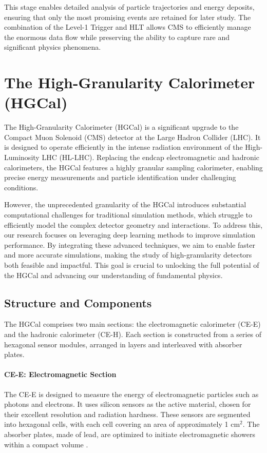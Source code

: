 This stage enables detailed analysis of particle trajectories and energy deposits, ensuring that only the most promising events are retained for later study. The combination of the Level-1 Trigger and HLT allows CMS to efficiently manage the enormous data flow while preserving the ability to capture rare and significant physics phenomena.

\section{The High-Granularity Calorimeter (HGCal)}

The High-Granularity Calorimeter (HGCal) is a significant upgrade to the Compact Muon Solenoid (CMS) detector at the Large Hadron Collider (LHC). It is designed to operate efficiently in the intense radiation environment of the High-Luminosity LHC (HL-LHC). Replacing the endcap electromagnetic and hadronic calorimeters, the HGCal features a highly granular sampling calorimeter, enabling precise energy measurements and particle identification under challenging conditions.

However, the unprecedented granularity of the HGCal introduces substantial computational challenges for traditional simulation methods, which struggle to efficiently model the complex detector geometry and interactions. To address this, our research focuses on leveraging deep learning methods to improve simulation performance. By integrating these advanced techniques, we aim to enable faster and more accurate simulations, making the study of high-granularity detectors both feasible and impactful. This goal is crucial to unlocking the full potential of the HGCal and advancing our understanding of fundamental physics.

\subsection{Structure and Components}

The HGCal comprises two main sections: the electromagnetic calorimeter (CE-E) and the hadronic calorimeter (CE-H). Each section is constructed from a series of hexagonal sensor modules, arranged in layers and interleaved with absorber plates.

\paragraph{CE-E: Electromagnetic Section}
The CE-E is designed to measure the energy of electromagnetic particles such as photons and electrons. It uses silicon sensors as the active material, chosen for their excellent resolution and radiation hardness. These sensors are segmented into hexagonal cells, with each cell covering an area of approximately 1 cm$^2$. The absorber plates, made of lead, are optimized to initiate electromagnetic showers within a compact volume \cite{hgcal_tdr}.


